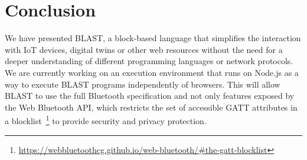 \documentclass[runningheads]{llncs}
\begin{document}
\section{Conclusion}

We have presented BLAST, a block-based language that simplifies the interaction with IoT devices, digital twins or other web resources without the need for a deeper understanding of different programming languages or network protocols.
We are currently working on an execution environment that runs on Node.js as a way to execute BLAST programs independently of browsers. This will allow BLAST to use the full Bluetooth specification and not only features exposed by the Web Bluetooth API, which restricts the set of accessible GATT attributes in a blocklist~\footnote{\url{https://webbluetoothcg.github.io/web-bluetooth/\#the-gatt-blocklist}} to provide security and privacy protection.

%
%
%


%
\end{document}
